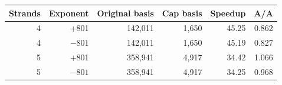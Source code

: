 \begin{tabular}{@{}rrrrrr@{}}
\toprule
Strands & Exponent & Original basis & Cap basis & Speedup & A/A \\
\midrule
4 & +801 & 142,011 & 1,650 & 45.25 & 0.862 \\
4 & $-801$ & 142,011 & 1,650 & 45.19 & 0.827 \\
5 & +801 & 358,941 & 4,917 & 34.42 & 1.066 \\
5 & $-801$ & 358,941 & 4,917 & 34.25 & 0.968 \\
\bottomrule
\end{tabular}
